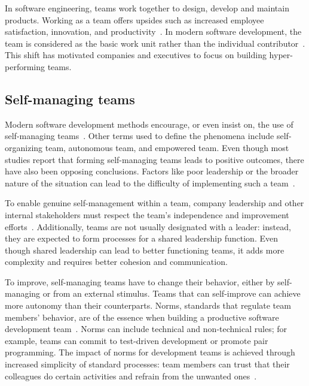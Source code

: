In software engineering, teams work together to design, develop and maintain products. Working as a team offers upsides such as increased employee satisfaction, innovation, and productivity~\cite{moe_teamwork_2010}. In modern software development, the team is considered as the basic work unit rather than the individual contributor~\cite{moe_overcoming_2010}. This shift has motivated companies and executives to focus on building hyper-performing teams.

\subsection{Self-managing teams}

Modern software development methods encourage, or even insist on, the use of self-mana\-ging teams~\cite{moe_teamwork_2010,fowler_agile_2001}. Other terms used to define the phenomena include self-organizing team, autonomous team, and empowered team. Even though most studies report that forming self-managing teams leads to positive outcomes, there have also been opposing conclusions. Factors like poor leadership or the broader nature of the situation can lead to the difficulty of implementing such a team~\cite{moe_teamwork_2010}. 

To enable genuine self-management within a team, company leadership and other internal stakeholders must respect the team's independence and improvement efforts~\cite{moe_overcoming_2010}. Additionally, teams are not usually designated with a leader: instead, they are expected to form processes for a shared leadership function. Even though shared leadership can lead to better functioning teams, it adds more complexity and requires better cohesion and communication.~\cite{solansky_leadership_2008}

To improve, self-managing teams have to change their behavior, either by self-managing or from an external stimulus. Teams that can self-improve can achieve more autonomy than their counterparts. Norms, standards that regulate team members' behavior, are of the essence when building a productive software development team~\cite{abrahamsson_exploring_2016}. Norms can include technical and non-technical rules; for example, teams can commit to test-driven development or promote pair programming. The impact of norms for development teams is achieved through increased simplicity of standard processes: team members can trust that their colleagues do certain activities and refrain from the unwanted ones~\cite{abrahamsson_exploring_2016}. 

